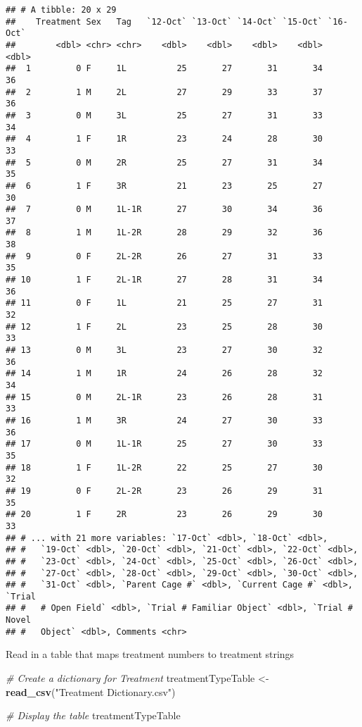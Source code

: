\documentclass[]{article}
\newenvironment{Shaded}{\begin{snugshade}}{\end{snugshade}}
\newcommand{\KeywordTok}[1]{\textcolor[rgb]{0.13,0.29,0.53}{\textbf{#1}}}
\newcommand{\StringTok}[1]{\textcolor[rgb]{0.31,0.60,0.02}{#1}}
\newcommand{\CommentTok}[1]{\textcolor[rgb]{0.56,0.35,0.01}{\textit{#1}}}
\newcommand{\NormalTok}[1]{#1}
\begin{document}
\begin{verbatim}
## # A tibble: 20 x 29
##    Treatment Sex   Tag   `12-Oct` `13-Oct` `14-Oct` `15-Oct` `16-Oct`
##        <dbl> <chr> <chr>    <dbl>    <dbl>    <dbl>    <dbl>    <dbl>
##  1         0 F     1L          25       27       31       34       36
##  2         1 M     2L          27       29       33       37       36
##  3         0 M     3L          25       27       31       33       34
##  4         1 F     1R          23       24       28       30       33
##  5         0 M     2R          25       27       31       34       35
##  6         1 F     3R          21       23       25       27       30
##  7         0 M     1L-1R       27       30       34       36       37
##  8         1 M     1L-2R       28       29       32       36       38
##  9         0 F     2L-2R       26       27       31       33       35
## 10         1 F     2L-1R       27       28       31       34       36
## 11         0 F     1L          21       25       27       31       32
## 12         1 F     2L          23       25       28       30       33
## 13         0 M     3L          23       27       30       32       36
## 14         1 M     1R          24       26       28       32       34
## 15         0 M     2L-1R       23       26       28       31       33
## 16         1 M     3R          24       27       30       33       36
## 17         0 M     1L-1R       25       27       30       33       35
## 18         1 F     1L-2R       22       25       27       30       32
## 19         0 F     2L-2R       23       26       29       31       35
## 20         1 F     2R          23       26       29       30       33
## # ... with 21 more variables: `17-Oct` <dbl>, `18-Oct` <dbl>,
## #   `19-Oct` <dbl>, `20-Oct` <dbl>, `21-Oct` <dbl>, `22-Oct` <dbl>,
## #   `23-Oct` <dbl>, `24-Oct` <dbl>, `25-Oct` <dbl>, `26-Oct` <dbl>,
## #   `27-Oct` <dbl>, `28-Oct` <dbl>, `29-Oct` <dbl>, `30-Oct` <dbl>,
## #   `31-Oct` <dbl>, `Parent Cage #` <dbl>, `Current Cage #` <dbl>, `Trial
## #   # Open Field` <dbl>, `Trial # Familiar Object` <dbl>, `Trial # Novel
## #   Object` <dbl>, Comments <chr>
\end{verbatim}

Read in a table that maps treatment numbers to treatment strings

\begin{Shaded}
\begin{Highlighting}[]
\CommentTok{# Create a dictionary for Treatment}
\NormalTok{treatmentTypeTable <-}\StringTok{ }\KeywordTok{read_csv}\NormalTok{(}\StringTok{"Treatment Dictionary.csv"}\NormalTok{)}

\CommentTok{# Display the table}
\NormalTok{treatmentTypeTable}
\end{Highlighting}
\end{Shaded}
\end{document}
